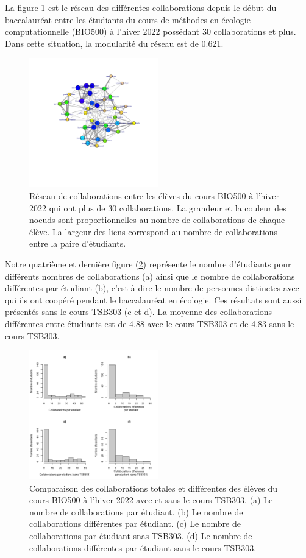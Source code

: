 \documentclass[9pt,twocolumn,twoside,]{pnas-new}
\begin{document}
La figure \ref{fig:plot3} est le réseau des différentes collaborations
depuis le début du baccalauréat entre les étudiants du cours de méthodes
en écologie computationnelle (BIO500) à l'hiver 2022 possédant 30
collaborations et plus. Dans cette situation, la modularité du réseau
est de 0.621.

\begin{figure}
\centering
\includegraphics[width=0.5\textwidth,height=0.4\textheight]{"../results/figure3.png"}
\caption{Réseau de collaborations entre les élèves du cours BIO500 à
l'hiver 2022 qui ont plus de 30 collaborations. La grandeur et la
couleur des noeuds sont proportionnelles au nombre de collaborations de
chaque élève. La largeur des liens correspond au nombre de
collaborations entre la paire d'étudiants. \label{fig:plot3}}
\end{figure}

Notre quatrième et dernière figure (\ref{fig:plot4}) représente le
nombre d'étudiants pour différents nombres de collaborations (a) ainsi
que le nombre de collaborations différentes par étudiant (b), c'est à
dire le nombre de personnes distinctes avec qui ils ont coopéré pendant
le baccalauréat en écologie. Ces résultats sont aussi présentés sans le
cours TSB303 (c et d). La moyenne des collaborations différentes entre
étudiants est de 4.88 avec le cours TSB303 et de 4.83 sans le cours
TSB303.

\begin{figure}
\centering
\includegraphics[width=0.5\textwidth,height=0.4\textheight]{"../results/figure4.png"}
\caption{Comparaison des collaborations totales et différentes des
élèves du cours BIO500 à l'hiver 2022 avec et sans le cours TSB303. (a)
Le nombre de collaborations par étudiant. (b) Le nombre de
collaborations différentes par étudiant. (c) Le nombre de collaborations
par étudiant snas TSB303. (d) Le nombre de collaborations différentes
par étudiant sans le cours TSB303. \label{fig:plot4}}
\end{figure}
\end{document}

